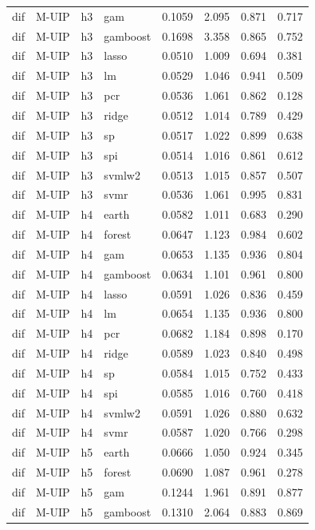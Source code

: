 \begin{ThreePartTable}
\begin{longtable}[t]{llclcccc}
dif & M-UIP & h3 & gam & 0.1059 & 2.095 & 0.871 & 0.717\\
dif & M-UIP & h3 & gamboost & 0.1698 & 3.358 & 0.865 & 0.752\\
dif & M-UIP & h3 & lasso & 0.0510 & 1.009 & 0.694 & 0.381\\
dif & M-UIP & h3 & lm & 0.0529 & 1.046 & 0.941 & 0.509\\
dif & M-UIP & h3 & pcr & 0.0536 & 1.061 & 0.862 & 0.128\\
dif & M-UIP & h3 & ridge & 0.0512 & 1.014 & 0.789 & 0.429\\
dif & M-UIP & h3 & sp & 0.0517 & 1.022 & 0.899 & 0.638\\
dif & M-UIP & h3 & spi & 0.0514 & 1.016 & 0.861 & 0.612\\
dif & M-UIP & h3 & svmlw2 & 0.0513 & 1.015 & 0.857 & 0.507\\
dif & M-UIP & h3 & svmr & 0.0536 & 1.061 & 0.995 & 0.831\\
\addlinespace
dif & M-UIP & h4 & earth & 0.0582 & 1.011 & 0.683 & 0.290\\
dif & M-UIP & h4 & forest & 0.0647 & 1.123 & 0.984 & 0.602\\
dif & M-UIP & h4 & gam & 0.0653 & 1.135 & 0.936 & 0.804\\
dif & M-UIP & h4 & gamboost & 0.0634 & 1.101 & 0.961 & 0.800\\
dif & M-UIP & h4 & lasso & 0.0591 & 1.026 & 0.836 & 0.459\\
dif & M-UIP & h4 & lm & 0.0654 & 1.135 & 0.936 & 0.800\\
dif & M-UIP & h4 & pcr & 0.0682 & 1.184 & 0.898 & 0.170\\
dif & M-UIP & h4 & ridge & 0.0589 & 1.023 & 0.840 & 0.498\\
dif & M-UIP & h4 & sp & 0.0584 & 1.015 & 0.752 & 0.433\\
dif & M-UIP & h4 & spi & 0.0585 & 1.016 & 0.760 & 0.418\\
dif & M-UIP & h4 & svmlw2 & 0.0591 & 1.026 & 0.880 & 0.632\\
dif & M-UIP & h4 & svmr & 0.0587 & 1.020 & 0.766 & 0.298\\
\addlinespace
dif & M-UIP & h5 & earth & 0.0666 & 1.050 & 0.924 & 0.345\\
dif & M-UIP & h5 & forest & 0.0690 & 1.087 & 0.961 & 0.278\\
dif & M-UIP & h5 & gam & 0.1244 & 1.961 & 0.891 & 0.877\\
dif & M-UIP & h5 & gamboost & 0.1310 & 2.064 & 0.883 & 0.869\\

\end{longtable}
\end{ThreePartTable}
